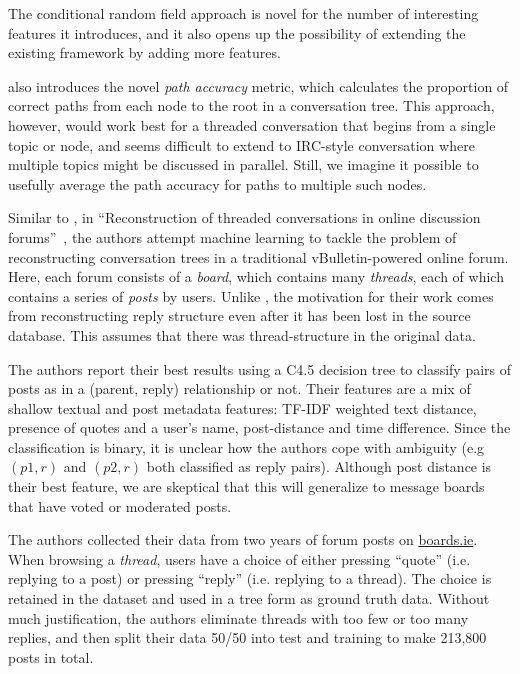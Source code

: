 \documentclass[11pt]{article}
\newcommand{\titlecite}[2]{``#1''~\cite{#2}}
\begin{document}
The conditional random field approach is novel for the number
of interesting features it introduces, and it also opens up the possibility of
extending the existing framework by adding more features.

\cite{Wang2011a} also introduces the novel \emph{path accuracy} metric, which
calculates the proportion of correct paths from each node to the root in a
conversation tree. This approach, however, would work best for a threaded
conversation that begins from a single topic or node, and seems difficult to extend
to IRC-style conversation where multiple topics might
be discussed in parallel. Still, we imagine it possible to usefully average the path
accuracy for paths to multiple such nodes.

Similar to \cite{Wang2011a}, in \titlecite{Reconstruction of threaded
conversations in online discussion forums}{Aumayr2011a}, the authors attempt machine learning to 
tackle the problem of reconstructing conversation trees in a traditional
vBulletin-powered online forum. Here, each forum consists of a \textit{board}, which
contains many \textit{threads}, each of which contains a series of
\textit{posts} by users. Unlike \cite{Wang2008a}, the motivation for their work
comes from reconstructing reply structure even after it has been lost in the
source database. This assumes that there was thread-structure in the original
data.

The authors report their best results using a C4.5 decision tree to classify
pairs of posts as in a (parent, reply) relationship or not. Their features are 
a mix of shallow textual and post metadata features: TF-IDF weighted text distance, 
presence of quotes and a user's name, post-distance and time difference. 
Since the classification is binary, it 
is unclear how the authors cope with ambiguity (e.g $(p1, r)$ and $(p2,r)$ both 
classified as reply pairs). Although post distance is their best feature, we are skeptical
that this will generalize to message boards that have voted or moderated posts.

The authors collected their data from two years of forum posts on
\url{boards.ie}. When browsing a \textit{thread}, users have a choice of either
pressing ``quote'' (i.e. replying to a post) or pressing ``reply'' (i.e.
replying to a thread). The choice is retained in the dataset and used in a
tree form as ground truth data. Without much justification, the authors eliminate
threads with too few or too many replies, and then split their data 50/50 into 
test and training to make 213,800 posts in total.
\end{document}
